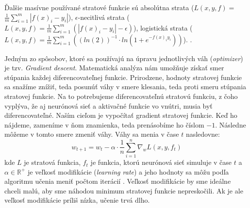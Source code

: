 Ďalšie masívne používané stratové funkcie sú 
absolútna strata ($L(x,y,f) = $ $\frac{1}{m}\sum_{i=1}^m \left|f(x)_i - y_i\right|$), 
$\epsilon$-necitlivá strata ($L(x,y,f) = \frac{1}{m}\sum_{i=1}^m \left(\left|f(x)_i - y_i\right| - \epsilon\right)$), 
logistická strata ($L(x,y,f) = \frac{1}{m} \sum_{i=1}^m  \left((ln(2))^{-1}\cdot ln(1+e^{-f(x)_iy_i})\right) $).
\citep{loss}.

Jedným zo spôsobov, ktoré sa používajú na úpravu jednotlivých váh (\textit{optimizer}) je tzv. \textit{Gradient descent}.
Matematická analýza nám umožňuje získať smer stúpania každej diferencovateľnej funkcie.
Prirodzene, hodnoty stratovej funkcie sa snažíme znížiť, teda posunúť váhy v smere klesania, teda proti smeru stúpania stratovej funkcie.
Na to potrebujeme diferencovateľnú stratovú funkciu, z čoho vyplýva, že aj neurónová sieť a aktivačné funkcie vo vnútri, musia byť diferencovateľné.
Naším cieľom je vypočítať gradient stratovej funkcie.
Keď ho nájdeme, zameníme v ňom znamienka, teda prenásobíme ho číslom $-1$.
Následne môžeme v tomto smere zmeniť váhy.
Váhy sa menia v čase $t$ nasledovne: 
$$w_{t+1} = w_t - \alpha \cdot \frac{1}{n} \sum_{i=1}^n \nabla_w L(x,y,f_t)$$
kde $L$ je stratová funkcia, $f_t$ je funkcia, ktorú neurónová sieť simuluje v čase $t$  a $\alpha \in \mathbb{R}^+$ je veľkosť modifikácie (\textit{learning rate}) a jeho hodnoty sa môžu podľa algoritmu učenia meniť počtom iterácií \citep{nn:gd}. Veľkosť modifikácie by sme ideálne chceli malú, aby sme náhodou minimum stratovej funkcie nepreskočili. Ak je ale veľkosť modifikácie príliš nízka, učenie trvá dlho.


